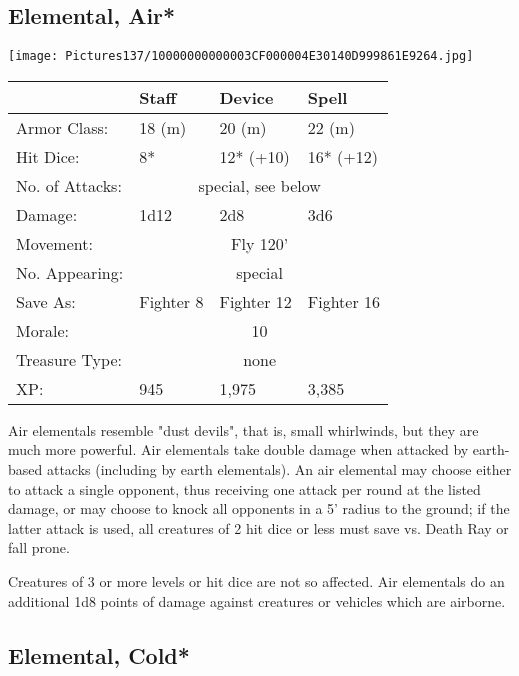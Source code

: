 \documentclass[a4paper,twoside,openany,10pt]{book}
\begin{document}
\begin{multicols}{2}
\subsection*{Elemental, Air*}\label{elemental-air}

\begin{center}
	\texttt{[image: Pictures137/10000000000003CF000004E30140D999861E9264.jpg]}
\end{center}

\begin{tabularx}{0.48\textwidth}[]{@{}lXXX@{}}
& Staff & Device & Spell \\\hline
Armor Class: & 18 (m) & 20 (m) & 22 (m) \\\hline
Hit Dice: & 8* & 12* (+10) & 16* (+12) \\\hline
No. of Attacks: & \multicolumn{3}{c}{special, see below} \\\hline
Damage: & 1d12 & 2d8 & 3d6 \\\hline
Movement: & \multicolumn{3}{c}{Fly 120'} \\\hline
No. Appearing: &  \multicolumn{3}{c}{special} \\\hline
Save As: & Fighter 8 & Fighter 12 & Fighter 16 \\\hline
Morale: & \multicolumn{3}{c}{10} \\\hline
Treasure Type: & \multicolumn{3}{c}{none} \\\hline
XP: & 945 & 1,975 & 3,385 \\\hline
\end{tabularx}\medskip



Air elementals resemble "dust devils", that is, small whirlwinds, but they are much more powerful. Air elementals take double damage when attacked by earth-based attacks (including by earth elementals). An air elemental may choose either to attack a single opponent, thus receiving one attack per round at the listed damage, or may choose to knock all opponents in a 5' radius to the ground; if the latter attack is used, all creatures of 2 hit dice or less must save vs. Death Ray or fall prone. 

Creatures of 3 or more levels or hit dice are not so affected. Air elementals do an additional 1d8 points of damage against creatures or vehicles which are airborne.

\subsection*{Elemental, Cold*}\label{elemental-cold}


\end{multicols}
\end{document}
